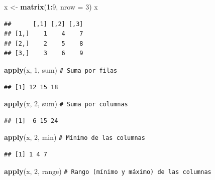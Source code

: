\documentclass[
]{book}
\newenvironment{Shaded}{\begin{snugshade}}{\end{snugshade}}
\newcommand{\AttributeTok}[1]{\textcolor[rgb]{0.13,0.29,0.53}{#1}}
\newcommand{\CommentTok}[1]{\textcolor[rgb]{0.56,0.35,0.01}{\textit{#1}}}
\newcommand{\DecValTok}[1]{\textcolor[rgb]{0.00,0.00,0.81}{#1}}
\newcommand{\FunctionTok}[1]{\textcolor[rgb]{0.13,0.29,0.53}{\textbf{#1}}}
\newcommand{\NormalTok}[1]{#1}
\newcommand{\OtherTok}[1]{\textcolor[rgb]{0.56,0.35,0.01}{#1}}
\newcommand{\SpecialCharTok}[1]{\textcolor[rgb]{0.81,0.36,0.00}{\textbf{#1}}}
\theoremstyle{break}
\theoremstyle{nonumberplain}
\renewcommand{\CommentTok}[1]{\textcolor[rgb]{0.41,0.41,0.41}{\texttt{#1}}}
\begin{document}
\begin{Shaded}
\begin{Highlighting}[]
\NormalTok{x }\OtherTok{\textless{}{-}} \FunctionTok{matrix}\NormalTok{(}\DecValTok{1}\SpecialCharTok{:}\DecValTok{9}\NormalTok{, }\AttributeTok{nrow =} \DecValTok{3}\NormalTok{)}
\NormalTok{x}
\end{Highlighting}
\end{Shaded}

\begin{verbatim}
##      [,1] [,2] [,3]
## [1,]    1    4    7
## [2,]    2    5    8
## [3,]    3    6    9
\end{verbatim}

\begin{Shaded}
\begin{Highlighting}[]
\FunctionTok{apply}\NormalTok{(x, }\DecValTok{1}\NormalTok{, sum)    }\CommentTok{\# Suma por filas}
\end{Highlighting}
\end{Shaded}

\begin{verbatim}
## [1] 12 15 18
\end{verbatim}

\begin{Shaded}
\begin{Highlighting}[]
\FunctionTok{apply}\NormalTok{(x, }\DecValTok{2}\NormalTok{, sum)    }\CommentTok{\# Suma por columnas}
\end{Highlighting}
\end{Shaded}

\begin{verbatim}
## [1]  6 15 24
\end{verbatim}

\begin{Shaded}
\begin{Highlighting}[]
\FunctionTok{apply}\NormalTok{(x, }\DecValTok{2}\NormalTok{, min)    }\CommentTok{\# Mínimo de las columnas}
\end{Highlighting}
\end{Shaded}

\begin{verbatim}
## [1] 1 4 7
\end{verbatim}

\begin{Shaded}
\begin{Highlighting}[]
\FunctionTok{apply}\NormalTok{(x, }\DecValTok{2}\NormalTok{, range)  }\CommentTok{\# Rango (mínimo y máximo) de las columnas}
\end{Highlighting}
\end{Shaded}
\end{document}
